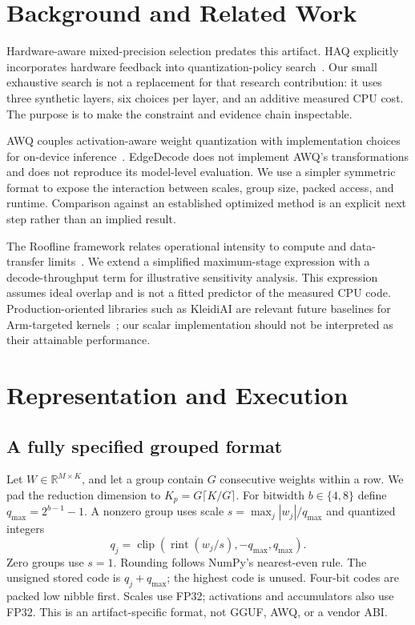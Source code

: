 \documentclass[11pt]{article}
\begin{document}
\section{Background and Related Work}
Hardware-aware mixed-precision selection predates this artifact. HAQ explicitly
incorporates hardware feedback into quantization-policy search~\cite{haq}. Our
small exhaustive search is not a replacement for that research contribution: it
uses three synthetic layers, six choices per layer, and an additive measured CPU
cost. The purpose is to make the constraint and evidence chain inspectable.

AWQ couples activation-aware weight quantization with implementation choices for
on-device inference~\cite{awq}. EdgeDecode does not implement AWQ's transformations
and does not reproduce its model-level evaluation. We use a simpler symmetric
format to expose the interaction between scales, group size, packed access, and
runtime. Comparison against an established optimized method is an explicit next
step rather than an implied result.

The Roofline framework relates operational intensity to compute and data-transfer
limits~\cite{roofline}. We extend a simplified maximum-stage expression with a
decode-throughput term for illustrative sensitivity analysis. This expression
assumes ideal overlap and is not a fitted predictor of the measured CPU code.
Production-oriented libraries such as KleidiAI are relevant future baselines for
Arm-targeted kernels~\cite{kleidiai}; our scalar implementation should not be
interpreted as their attainable performance.

\section{Representation and Execution}
\subsection{A fully specified grouped format}
Let $W\in\mathbb{R}^{M\times K}$, and let a group contain $G$ consecutive weights
within a row. We pad the reduction dimension to
$K_p=G\lceil K/G\rceil$. For bitwidth $b\in\{4,8\}$ define
$q_{\max}=2^{b-1}-1$. A nonzero group uses scale
$s=\max_j|w_j|/q_{\max}$ and quantized integers
\begin{equation}
q_j=\operatorname{clip}\!\left(\operatorname{rint}(w_j/s),
-q_{\max},q_{\max}\right).
\end{equation}
Zero groups use $s=1$. Rounding follows NumPy's nearest-even rule. The unsigned
stored code is $q_j+q_{\max}$; the highest code is unused. Four-bit codes are
packed low nibble first. Scales use FP32; activations and accumulators also use
FP32. This is an artifact-specific format, not GGUF, AWQ, or a vendor ABI.
\end{document}
